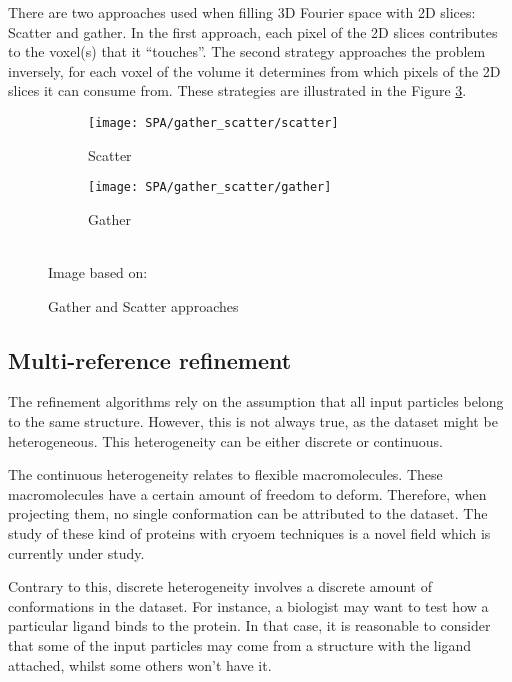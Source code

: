 \documentclass[../main.tex]{subfiles}
\begin{document}
There are two approaches used when filling 3D Fourier space with 2D slices: Scatter and gather. In the first approach, each pixel of the 2D slices contributes to the voxel(s) that it ``touches''. The second strategy approaches the problem inversely, for each voxel of the volume it determines from which pixels of the 2D slices it can consume from\cite{strelak2019}. These strategies are illustrated in the Figure \ref{fig:3:gather_scatter}.

\begin{figure}[htbp]
    \centering
    \begin{subfigure}[b]{0.45\textwidth}
         \centering
         \texttt{[image: SPA/gather\_scatter/scatter]}
         \caption{Scatter}
         \label{fig:4:gather_scatter:scatter}
    \end{subfigure}
    \begin{subfigure}[b]{0.45\textwidth}
         \centering
         \texttt{[image: SPA/gather\_scatter/gather]}
         \caption{Gather}
         \label{fig:4:gather_scatter:gather}
    \end{subfigure}\\
    Image based on: \cite{strelak2019}
    \caption{Gather and Scatter approaches}
    \label{fig:3:gather_scatter}
\end{figure}


\subsection{Multi-reference refinement}
The refinement algorithms rely on the assumption that all input particles belong to the same structure. However, this is not always true, as the dataset might be heterogeneous. This heterogeneity can be either discrete or continuous. 

The continuous heterogeneity relates to flexible macromolecules. These macromolecules have a certain amount of freedom to deform. Therefore, when projecting them, no single conformation can be attributed to the dataset. The study of these kind of proteins with \gls{cryoem} techniques is a novel field which is currently under study\cite{herreros2021}.

Contrary to this, discrete heterogeneity involves a discrete amount of conformations in the dataset. For instance, a biologist may want to test how a particular ligand binds to the protein. In that case, it is reasonable to consider that some of the input particles may come from a structure with the ligand attached, whilst some others won't have it.
\end{document}
